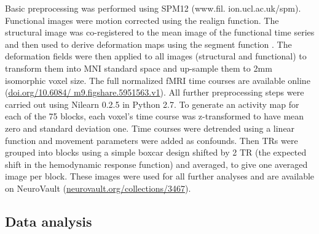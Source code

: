 \documentclass[fleqn,10pt]{SelfArx} %
\begin{document}
Basic preprocessing was performed using SPM12 (www.fil. ion.ucl.ac.uk/spm). Functional images were motion corrected using the realign function. The structural image was co-registered to the mean image of the functional time series and then used to derive deformation maps using the segment function \citep{Ashburner_2005}. The deformation fields were then applied to all images (structural and functional) to transform them into MNI standard space and up-sample them to 2mm isomorphic voxel size. The full normalized fMRI time courses are available online (\href{https://doi.org/10.6084/m9.figshare.5951563.v1}{doi.org/10.6084/ m9.figshare.5951563.v1}). All further preprocessing steps were carried out using Nilearn 0.2.5 \citep{Abraham_2014} in Python 2.7. To generate an activity map for each of the 75 blocks, each voxel's time course was z-transformed to have mean zero and standard deviation one. Time courses were detrended using a linear function and movement parameters were added as confounds. Then TRs were grouped into blocks using a simple boxcar design shifted by 2 TR (the expected shift in the hemodynamic response function) and averaged, to give one averaged image per block. These images were used for all further analyses and are available on NeuroVault (\href{https://neurovault.org/collections/3467}{neurovault.org/collections/3467}). 

\subsection{Data analysis}
\end{document}
